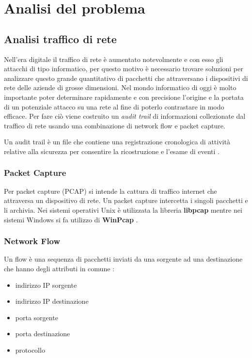 \documentclass[../main.tex]{subfiles}
\begin{document}
\chapter{Analisi del problema}

\section{Analisi traffico di rete}

Nell'era digitale il traffico di rete è aumentato notevolmente e con esso gli attacchi di tipo informatico, per questo motivo è necessario trovare soluzioni per analizzare questo grande quantitativo di pacchetti che attraversano i dispositivi di rete delle aziende di grosse dimensioni. Nel mondo informatico di oggi è molto importante poter determinare rapidamente e con precisione l'origine e la portata di un potenziale attacco su una rete al fine di poterlo contrastare in modo efficace.
Per fare ciò viene costruito un \textit{audit trail} di informazioni collezionate dal traffico di rete usando una combinazione di network flow e packet capture.

Un audit trail è un file che contiene una registrazione cronologica di attività relative alla sicurezza per consentire la ricostruzione e l'esame di eventi \cite{auditTrail}.

\subsection{Packet Capture}
Per packet capture (PCAP) si intende la cattura di traffico internet che attraversa un dispositivo di rete. Un packet capture intercetta i singoli pacchetti e li archivia. Nei sistemi operativi Unix è utilizzata la libreria \textbf{libpcap} mentre nei sistemi Windows si fa utilizzo di \textbf{WinPcap} \cite{pcap}.

\subsection{Network Flow}
Un flow è una sequenza di pacchetti inviati da una sorgente ad una destinazione che hanno degli attributi in comune \cite{trafficflow}:
\begin{itemize}
				\item indirizzo IP sorgente
				\item indirizzo IP destinazione
				\item porta sorgente
				\item porta destinazione
				\item protocollo
\end{itemize}
\end{document}
